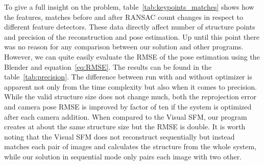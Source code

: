 To give a full insight on the problem, table~\ref{tab:keypoints_matches} shows how the features, matches before and after RANSAC count changes in respect to different feature detectors. These data directly affect number of structure points and precision of the reconstruction and pose estimation. Up until this point there was no reason for any comparison between our solution and other programs. However, we can quite easily evaluate the RMSE of the pose estimation using the Blender and equation~\ref{eq:RMSE}.  The results can be found in the table~\ref{tab:precision}. The difference between run with and without optimizer is apparent not only from the time complexity but also when it comes to precision. While the valid structure size does not change much, both the reprojection error and camera pose RMSE is improved by factor of ten if the system is optimized after each camera addition. When compared to the Visual SFM, our program creates at about the same structure size but the RMSE is double. It is worth noting that the Visual SFM does not reconstruct sequentially but instead matches each pair of images and calculates the structure from the whole system, while our solution in sequential mode only pairs each image with two other.

